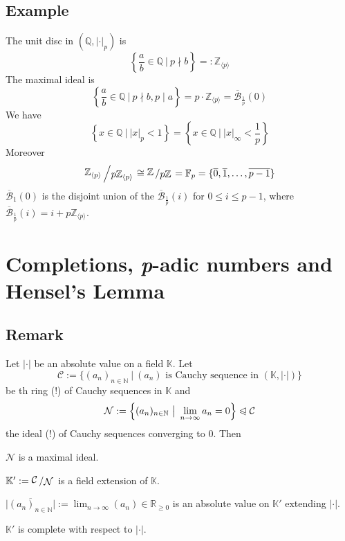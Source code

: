 \documentclass[12pt]{book}
\newcommand{\slant}[2]{{\raisebox{.1em}{$#1$}\left/\raisebox{-.1em}{$#2$}\right.}}
\begin{document}
\begin{spacing}{1.3}
\subsection{Example }%
\titleformat{\subsection}{\normalfont\normalsize\bfseries}{}{0em}{#1 \thesubsection}
The unit disc in $(\mathbb{Q}, |\cdot|_p)$ is
$$\left\{ \frac{a}{b} \in \mathbb{Q} \ \big\vert\ p\nmid b \right\} =: \mathbb{Z}_{\langle p\rangle}$$
The maximal ideal is
$$\left\{\frac{a}{b} \in \mathbb{Q} \ \big\vert\ p \nmid b, p\mid a \right\}=p\cdot \mathbb{Z}_{\langle p\rangle}=\overline{\mathcal{B}}_{\frac{1}{p}}(0)$$
We have
$$\left\{x \in \mathbb{Q} \ \big\vert\ |x|_p < 1\right\}=\left\{x \in \mathbb{Q} \ \big\vert\ |x|_{\infty} < \frac{1}{p} \right\}$$
Moreover
$$\slant{\mathbb{Z}_{\langle p\rangle}}{p \mathbb{Z}_{\langle p\rangle}} \cong \slant{\mathbb{Z}}{p\mathbb{Z}}=\mathbb{F}_p=\{\overline{0}, \overline{1}, \ldots, \overline{p-1}\}$$
$\overline{\mathcal{B}}_1(0)$ is the disjoint union of the $\overline{\mathcal{B}}_{\frac{1}{p}}(i)$ for $0\leqslant i \leqslant p-1$, where $\overline{\mathcal{B}}_{\frac{1}{p}}(i)=i+p\mathbb{Z}_{\langle p\rangle}$.


\renewcommand*\thesection{§ \arabic{section}\quad }
\section{Completions, \textit{p}-adic numbers and Hensel's Lemma}
\renewcommand*\thesection{\arabic{section}}

\subsection{Remark} %
Let $|\cdot|$ be an absolute value on a field $\mathbb{K}$. Let
$$\mathcal{C}:= \{(a_n)_{n \in \mathbb{N}} \ \big \vert \ (a_n) \textrm{ is Cauchy sequence in }(\mathbb{K}, |\cdot |) \}$$
be th ring (!) of Cauchy sequences in $\mathbb{K}$ and 
$$\mathcal{N}:= \left\{(a_n)_{n \in \mathbb{N}}\ \big\vert \ \lim_{n \to \infty}a_n=0\right\} \trianglelefteqslant \mathcal{C}$$
the ideal (!) of Cauchy sequences converging to $0$.
Then
\begin{compactenum}
\item $\mathcal{N}$ is a maximal ideal.
\item $\mathbb{K}':=\slant{\mathcal{C}}{\mathcal{N}}$ is a field extension of $\mathbb{K}$.
\item $\vert \overline{(a_n)_{n \in \mathbb{N}}} \vert := \lim_{n \to \infty} (a_n) \in \mathbb{R}_{\geqslant 0}$ is an absolute value on $\mathbb{K}'$ extending $|\cdot|$.
\item $\mathbb{K}'$ is complete with respect to $|\cdot|$.
\end{compactenum}


\end{spacing}
\end{document}
